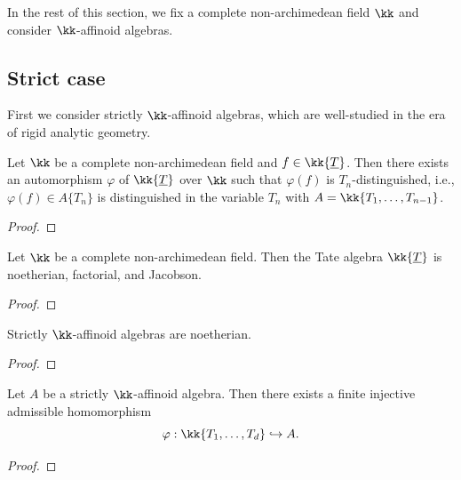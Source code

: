     In the rest of this section, we fix a complete non-archimedean field \(\kk\) and consider \(\kk\)-affinoid algebras.


\subsection{Strict case}

    First we consider strictly \(\kk\)-affinoid algebras, which are well-studied in the era of rigid analytic geometry.

    \begin{proposition}\label{prop:automorphism_of_T_n_over_k}
        Let \(\kk\) be a complete non-archimedean field and \(f \in \kk\{\underline{T}\}\).
        Then there exists an automorphism \(\varphi\) of \(\kk\{\underline{T}\}\) over \(\kk\) such that \(\varphi(f)\) is \(T_n\)-distinguished, 
        i.e., \(\varphi(f) \in A\{T_n\}\) is distinguished in the variable \(T_n\) with \(A = \kk\{T_1, \ldots, T_{n-1}\}\).
    \end{proposition}
    \begin{proof}
    \end{proof}

    \begin{proposition}\label{prop:strictly_Tate_algebra_is_noetherian_factorial_and_Jacobson}
        Let \(\kk\) be a complete non-archimedean field.
        Then the Tate algebra \(\kk\{\underline{T}\}\) is noetherian, factorial, and Jacobson.
    \end{proposition}
    \begin{proof}
    \end{proof}

    \begin{corollary}\label{prop:affinoid_algebra_is_noetherian}
        Strictly \(\kk\)-affinoid algebras are noetherian.
    \end{corollary}
    \begin{proof}
    \end{proof}
    
    \begin{theorem}\label{thm:noetherian_normalization_theorem}
        Let \(A\) be a strictly \(\kk\)-affinoid algebra.
        Then there exists a finite injective admissible homomorphism
        \[
            \varphi: \kk\{ T_1, \ldots, T_d \} \hookrightarrow A.
        \]
    \end{theorem}
    \begin{proof}
    \end{proof}

